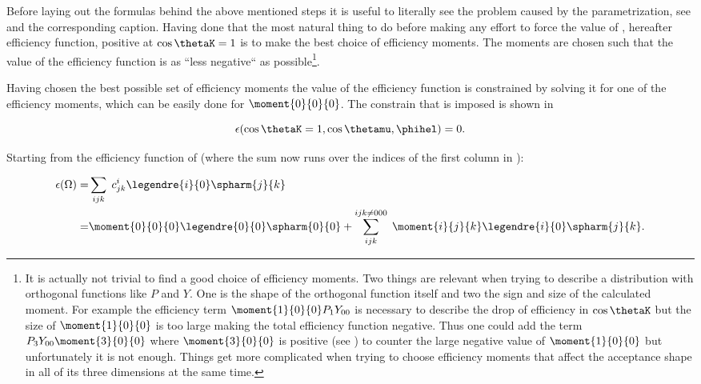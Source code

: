 Before laying out the formulas behind the above mentioned steps it is useful to literally see the problem caused by the parametrization, see 
and the corresponding caption. Having done that the most natural thing to do before making any effort to force the value of , hereafter efficiency function,
positive at $\cos\thetaK=1$ is to make the best choice of efficiency moments. The moments are chosen such that the value of the efficiency function is as ``less negative``
as
possible\footnote{It is actually not trivial to find a good choice of efficiency moments. Two things are relevant when trying to describe a
distribution with orthogonal functions like $P$ and $Y$. One is the shape of the orthogonal function itself and two the sign and size of the calculated moment.
For example the efficiency term $\moment{1}{0}{0}P_1Y_{00}$ is necessary to describe the drop of efficiency in $\cos\thetaK$ but the size of $\moment{1}{0}{0}$
is too large making the total efficiency function negative. Thus one could add the term $P_3Y_{00}\moment{3}{0}{0}$ where $\moment{3}{0}{0}$ is positive
(see  ) to counter the large negative value of $\moment{1}{0}{0}$ but unfortunately it is not enough. Things get more complicated
when trying to choose efficiency moments that affect the acceptance shape in all of its three dimensions at the same time.
}.

Having chosen the best possible set of efficiency moments the value of the efficiency function is constrained by solving it for
one of the efficiency moments, which can be easily done for $\moment{0}{0}{0}$. The constrain that is imposed is shown in 

\begin{center}
\begin{equation}
  \epsilon(\cos\thetaK = 1, \cos\thetamu, \phihel) = 0.
  \label{eff_func_constr}
\end{equation}
\end{center}

\noindent Starting from the efficiency function of  (where the sum now runs over the indices of the first column in ):

\begin{center}
\begin{align}
  \epsilon(\Omega) =& \sum_{ijk} \; c^i_{jk} \legendre{i}{0} \spharm{j}{k} \nonumber \\
                   =& \moment{0}{0}{0} \legendre{0}{0} \spharm{0}{0} + \sum_{ijk}^{ijk\neq 000} \; \moment{i}{j}{k} \legendre{i}{0} \spharm{j}{k}.
  \label{eff_func_rewriten}
\end{align}
\end{center}


